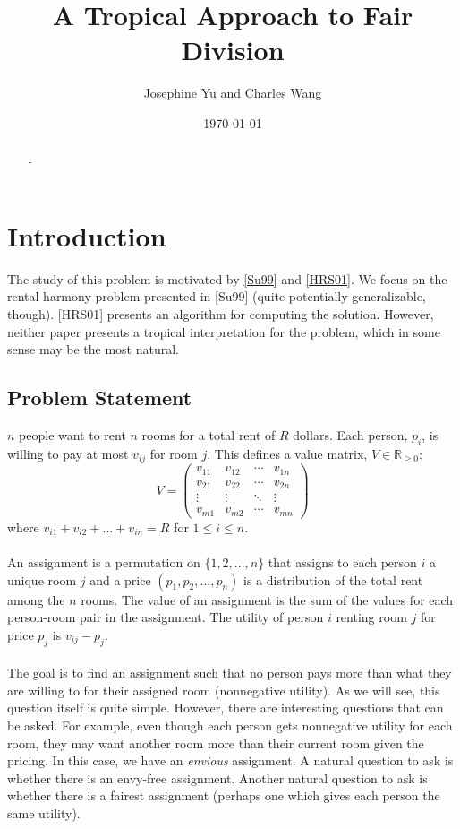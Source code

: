 \documentclass[12pt]{article}
\begin{document}
\title{\bf A Tropical Approach to Fair Division}
\author{Josephine Yu and Charles Wang}
\date{\today}

\maketitle

\begin{abstract}
-
\end{abstract}


\section{Introduction}

The study of this problem is motivated by \href{https://www.math.hmc.edu/~su/papers.dir/rent.pdf}{[Su99]} and \href{http://wwwhomes.uni-bielefeld.de/imw-wp/files//imw-wp-311.pdf}{[HRS01]}. We focus on the rental harmony problem presented in [Su99] (quite potentially generalizable, though). [HRS01] presents an algorithm for computing the solution. However, neither paper presents a tropical interpretation for the problem, which in some sense may be the most natural.

\subsection{Problem Statement}

$n$ people want to rent $n$ rooms for a total rent of $R$ dollars. Each person, $p_i$, is willing to pay at most $v_{ij}$ for room $j$. This defines a value matrix, $V\in\mathbb{R}_{\ge0}$: 
\[V= \left( \begin{array}{rrrr}
 v_{11} & v_{12} & \cdots & v_{1n} \\
 v_{21} & v_{22} & \cdots & v_{2n} \\
 \vdots & \vdots & \ddots & \vdots \\
 v_{m1} & v_{m2} & \cdots & v_{mn}
 \end{array} \right)\]
where $v_{i1}+v_{i2}+...+v_{in}=R$ for  $1\le i\le n$.
\\\\
An assignment is a permutation on $\{1,2,...,n\}$ that assigns to each person $i$ a unique room $j$ and a price $(p_1,p_2,...,p_n)$ is a distribution of the total rent among the $n$ rooms. The value of an assignment is the sum of the values for each person-room  pair in the assignment. The utility of person $i$ renting room $j$ for price $p_j$ is $v_{ij}-p_j$. 
\\\\
 The goal is to find an assignment such that no person pays more than what they are willing to for their assigned room (nonnegative utility). As we will see, this question itself is quite simple. However, there are interesting questions that can be asked. For example, even though each person gets nonnegative utility for each room, they may want another room more than their current room given the pricing. In this case, we have an \textit{envious} assignment. A natural question to ask is whether there is an envy-free assignment. Another natural question to ask is whether there is a fairest assignment (perhaps one which gives each person the same utility). 
\end{document}
